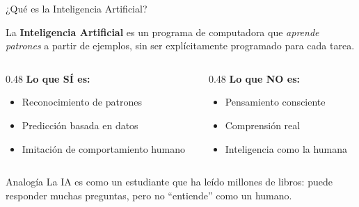 \documentclass[aspectratio=169,xcolor={dvipsnames}]{beamer}
\begin{document}
	\begin{frame}{¿Qué es la Inteligencia Artificial?}
		
		\begin{definition}
			La \textbf{Inteligencia Artificial} es un programa de computadora que \textit{aprende patrones} a partir de ejemplos, sin ser explícitamente programado para cada tarea.
		\end{definition}
		
		\vspace{0.5cm}
		
		\begin{columns}[T]
			\begin{column}{0.48\textwidth}
				\textbf{Lo que SÍ es:}
				\begin{itemize}
					\item Reconocimiento de patrones
					\item Predicción basada en datos
					\item Imitación de comportamiento humano
				\end{itemize}
			\end{column}
			
			\begin{column}{0.48\textwidth}
				\textbf{Lo que NO es:}
				\begin{itemize}
					\item Pensamiento consciente
					\item Comprensión real
					\item Inteligencia como la humana
				\end{itemize}
			\end{column}
		\end{columns}
		
		\vspace{0.5cm}
		
		\begin{exampleblock}{Analogía}
			La IA es como un estudiante que ha leído millones de libros: puede responder muchas preguntas, pero no ``entiende'' como un humano.
		\end{exampleblock}
		
	\end{frame}
	
\end{document}

